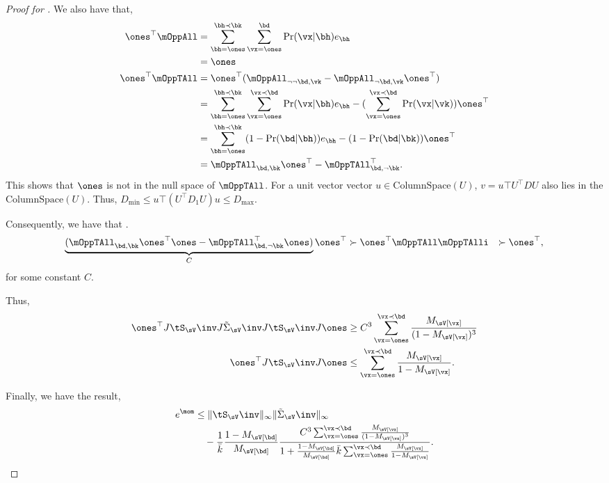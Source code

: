 \begin{proof}[Proof for ]
  We also have that,
  \begin{align*}
    \ones^\top \mOppAll 
      &= \sum_{\bh = \ones}^{\bh \prec \bk} \sum_{\vx = \ones}^{\bd} \Pr(\vx | \bh) e_\bh  \\
      &= \ones \\
    \ones^\top \mOppTAll 
        &= \ones^\top (\mOppAll_{\neg \neg \bd, \vk} - \mOppAll_{\neg \bd, \vk}\ones^\top) \\
        &= \sum_{\bh = \ones}^{\bh \prec \bk} \sum_{\vx = \ones}^{\vx \prec \bd} \Pr(\vx | \bh) e_\bh - (\sum_{\vx = \ones}^{\vx \prec \bd} \Pr(\vx | \vk)) \ones^\top  \\
        &= \sum_{\bh = \ones}^{\bh \prec \bk} (1 - \Pr(\bd | \bh)) e_\bh - (1 - \Pr(\bd | \bk)) \ones^\top  \\
        &= \mOppTAll_{\bd,\bk} \ones^\top - \mOppTAll_{\bd,\neg \bk}^\top.
  \end{align*}
  This shows that $\ones$ is not in the null space of $\mOppTAll$. 
  For a unit vector vector $u \in \text{ColumnSpace}(U)$, $v = u\top
  U^\top D U$ also lies in the $\text{ColumnSpace}(U)$. Thus, $D_{\min}
  \le u\top (U^\top D_1 U) u \le D_{\max}$.

  Consequently, we have that .
  \begin{align*}
    \underbrace{(\mOppTAll_{\bd,\bk} \ones^\top \ones - \mOppTAll_{\bd,\neg \bk}^\top \ones)}_{C} \ones^\top &\succ \ones^\top \mOppTAll \mOppTAlli &\succ \ones^\top,
  \end{align*}
  for some constant $C$.

  Thus,
  \begin{align*}
      \ones^\top J \tS_\sV\inv J \tilde\Sigma_\sV\inv J \tS_\sV\inv J \ones 
      &\ge C^3 \sum_{\vx=\ones}^{\vx \prec \bd} \frac{M_\sV[\vx]}{(1 - M_\sV[\vx])^3} \\
      \ones^\top J \tS_\sV\inv J \ones 
      &\le \sum_{\vx=\ones}^{\vx \prec \bd} \frac{M_\sV[\vx]}{1 - M_\sV[\vx]}.
  \end{align*}

  Finally, we have the result,
  \begin{align*}
    e^\mom 
    &\le \|\tS_\sV\inv\|_\infty  \|\tilde\Sigma_\sV\inv\|_\infty \\
    &\quad - \frac{1}{\bar k} \frac{1 - M_\sV[\bd]}{M_\sV[\bd]} \frac{C^3 \sum_{\vx=\ones}^{\vx \prec \bd} \frac{M_\sV[\vx]}{(1 - M_\sV[\vx])^3}}{1 + \frac{1 - M_\sV[\bd]}{M_\sV[\bd]} {\bar k} \sum_{\vx=\ones}^{\vx \prec \bd} \frac{M_\sV[\vx]}{1 - M_\sV[\vx]}}.
  \end{align*}


\end{proof}
